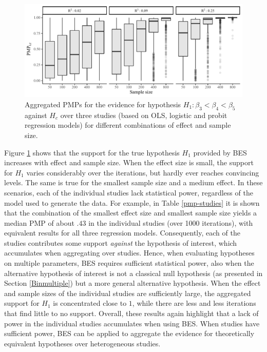 \documentclass[11pt,reqno]{article}
\begin{document}
\begin{figure}[ht]
   \centerline{\includegraphics[width=15cm]{r-files-bes-klugkist-volker-2022/Figures/sim1_box}}
 \caption{Aggregated PMPs for the evidence for hypothesis $H_1: \beta_3 < \beta_4 < \beta_5$ against $H_c$ over three studies (based on OLS, logistic and probit regression models) for different combinations of effect and sample size.}
 \label{sim1_box}
\end{figure}

Figure \ref{sim1_box} shows that the support for the true hypothesis $H_1$ provided by BES increases with effect and sample size.
When the effect size is small, the support for $H_1$ varies considerably over the iterations, but hardly ever reaches convincing levels.
The same is true for the smallest sample size and a medium effect.
In these scenarios, each of the individual studies lack statistical power, regardless of the model used to generate the data.
For example, in Table \ref{pmp-studies} it is shown that the combination of the smallest effect size and smallest sample size yields a median PMP of about $.43$ in the individual studies (over 1000 iterations), with equivalent results for all three regression models.
Consequently, each of the studies contributes some support \textit{against} the hypothesis of interest, which accumulates when aggregating over studies.
Hence, when evaluating hypotheses on multiple parameters, BES requires sufficient statistical power, also when the alternative hypothesis of interest is not a classical null hypothesis (as presented in Section \ref{Binmultiple}) but a more general alternative hypothesis.
When the effect and sample sizes of the individual studies are sufficiently large, the aggregated support for $H_1$ is concentrated close to $1$, while there are less and less iterations that find little to no support.
Overall, these results again highlight that a lack of power in the individual studies accumulates when using BES.
When studies have sufficient power, BES can be applied to aggregate the evidence for theoretically equivalent hypotheses over heterogeneous studies.
\end{document}
